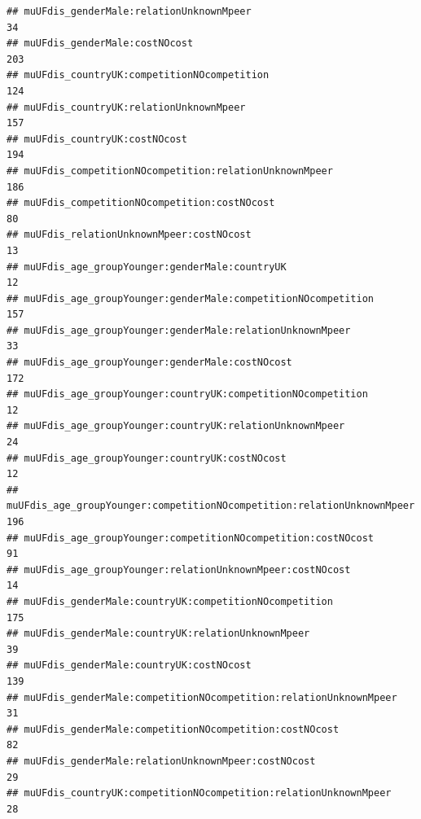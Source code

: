 \documentclass[
]{article}
\begin{document}
\begin{verbatim}
## muUFdis_genderMale:relationUnknownMpeer                                                            34
## muUFdis_genderMale:costNOcost                                                                     203
## muUFdis_countryUK:competitionNOcompetition                                                        124
## muUFdis_countryUK:relationUnknownMpeer                                                            157
## muUFdis_countryUK:costNOcost                                                                      194
## muUFdis_competitionNOcompetition:relationUnknownMpeer                                             186
## muUFdis_competitionNOcompetition:costNOcost                                                        80
## muUFdis_relationUnknownMpeer:costNOcost                                                            13
## muUFdis_age_groupYounger:genderMale:countryUK                                                      12
## muUFdis_age_groupYounger:genderMale:competitionNOcompetition                                      157
## muUFdis_age_groupYounger:genderMale:relationUnknownMpeer                                           33
## muUFdis_age_groupYounger:genderMale:costNOcost                                                    172
## muUFdis_age_groupYounger:countryUK:competitionNOcompetition                                        12
## muUFdis_age_groupYounger:countryUK:relationUnknownMpeer                                            24
## muUFdis_age_groupYounger:countryUK:costNOcost                                                      12
## muUFdis_age_groupYounger:competitionNOcompetition:relationUnknownMpeer                            196
## muUFdis_age_groupYounger:competitionNOcompetition:costNOcost                                       91
## muUFdis_age_groupYounger:relationUnknownMpeer:costNOcost                                           14
## muUFdis_genderMale:countryUK:competitionNOcompetition                                             175
## muUFdis_genderMale:countryUK:relationUnknownMpeer                                                  39
## muUFdis_genderMale:countryUK:costNOcost                                                           139
## muUFdis_genderMale:competitionNOcompetition:relationUnknownMpeer                                   31
## muUFdis_genderMale:competitionNOcompetition:costNOcost                                             82
## muUFdis_genderMale:relationUnknownMpeer:costNOcost                                                 29
## muUFdis_countryUK:competitionNOcompetition:relationUnknownMpeer                                    28

\end{verbatim}
\end{document}
